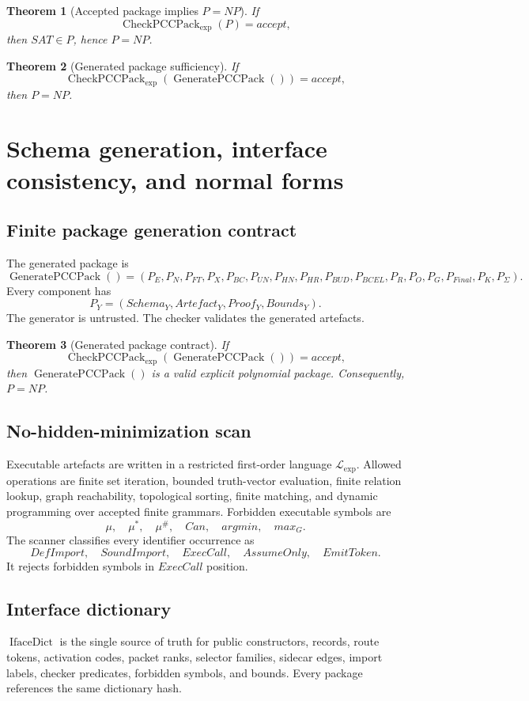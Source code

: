 \documentclass[10.5pt,a4paper]{article}
\newtheorem{theorem}{Theorem}[section]
\newcommand{\CheckPack}{\operatorname{CheckPCCPack}_{\exp}}
\newcommand{\GenPack}{\operatorname{GeneratePCCPack}}
\newcommand{\IfaceDict}{\operatorname{IfaceDict}}
\begin{document}
\begin{theorem}[Accepted package implies \(P=NP\)]
If
\[
\CheckPack(P)=accept,
\]
then \(SAT\in P\), hence \(P=NP\).
\end{theorem}

\begin{theorem}[Generated package sufficiency]
If
\[
\CheckPack(\GenPack())=accept,
\]
then \(P=NP\).
\end{theorem}

\section{Schema generation, interface consistency, and normal forms}

\subsection{Finite package generation contract}
The generated package is
\[
\GenPack()=(P_E,P_N,P_{FT},P_X,P_{BC},P_{UN},P_{HN},P_{HR},P_{BUD},P_{BCEL},P_R,P_O,P_G,P_{Final},P_K,P_\Sigma).
\]
Every component has
\[
P_Y=(Schema_Y,Artefact_Y,Proof_Y,Bounds_Y).
\]
The generator is untrusted. The checker validates the generated artefacts.

\begin{theorem}[Generated package contract]
If
\[
\CheckPack(\GenPack())=accept,
\]
then \(\GenPack()\) is a valid explicit polynomial package. Consequently, \(P=NP\).
\end{theorem}

\subsection{No-hidden-minimization scan}
Executable artefacts are written in a restricted first-order language \(\mathcal L_{\exp}\). Allowed operations are finite set iteration, bounded truth-vector evaluation, finite relation lookup, graph reachability, topological sorting, finite matching, and dynamic programming over accepted finite grammars. Forbidden executable symbols are
\[
\mu,
\quad \mu^*,
\quad \mu^\#,
\quad Can,
\quad argmin,
\quad max_G.
\]
The scanner classifies every identifier occurrence as
\[
DefImport,
\quad SoundImport,
\quad ExecCall,
\quad AssumeOnly,
\quad EmitToken.
\]
It rejects forbidden symbols in \(ExecCall\) position.

\subsection{Interface dictionary}
\(\IfaceDict\) is the single source of truth for public constructors, records, route tokens, activation codes, packet ranks, selector families, sidecar edges, import labels, checker predicates, forbidden symbols, and bounds. Every package references the same dictionary hash.
\end{document}
